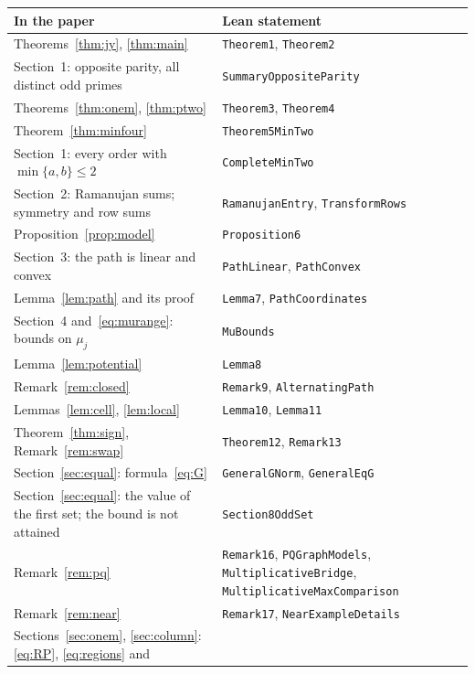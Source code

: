 \documentclass[11pt]{article}
\theoremstyle{remark}
\begin{document}
\begin{table}[ht]\centering\footnotesize
\begin{tabular}{@{}>{\raggedright\arraybackslash}p{}
 >{\raggedright\arraybackslash}p{}@{}}\toprule
In the paper & Lean statement\\\midrule
Theorems~\ref{thm:jy}, \ref{thm:main} & \texttt{Theorem1}, \texttt{Theorem2}\\
Section~1: opposite parity, all distinct odd primes &
 \texttt{SummaryOppositeParity}\\
Theorems~\ref{thm:onem}, \ref{thm:ptwo} & \texttt{Theorem3}, \texttt{Theorem4}\\
Theorem~\ref{thm:minfour} & \texttt{Theorem5MinTwo}\\
Section~1: every order with $\min\{a,b\}\le2$ & \texttt{CompleteMinTwo}\\
Section~2: Ramanujan sums; symmetry and row sums & \texttt{RamanujanEntry},
 \texttt{TransformRows}\\
Proposition~\ref{prop:model} & \texttt{Proposition6}\\
Section~3: the path is linear and convex & \texttt{PathLinear},
 \texttt{PathConvex}\\
Lemma~\ref{lem:path} and its proof & \texttt{Lemma7}, \texttt{PathCoordinates}\\
Section~4 and~\eqref{eq:murange}: bounds on $\mu_j$ & \texttt{MuBounds}\\
Lemma~\ref{lem:potential} & \texttt{Lemma8}\\
Remark~\ref{rem:closed} & \texttt{Remark9}, \texttt{AlternatingPath}\\
Lemmas~\ref{lem:cell}, \ref{lem:local} & \texttt{Lemma10}, \texttt{Lemma11}\\
Theorem~\ref{thm:sign}, Remark~\ref{rem:swap} & \texttt{Theorem12},
 \texttt{Remark13}\\
Section~\ref{sec:equal}: formula~\eqref{eq:G} & \texttt{GeneralGNorm},
 \texttt{GeneralEqG}\\
Section~\ref{sec:equal}: the value of the first set; the bound is not attained &
 \texttt{Section8OddSet}\\
Remark~\ref{rem:pq} & \texttt{Remark16}, \texttt{PQGraphModels},
 \texttt{MultiplicativeBridge}, \texttt{MultiplicativeMaxComparison}\\
Remark~\ref{rem:near} & \texttt{Remark17}, \texttt{NearExampleDetails}\\
Sections~\ref{sec:onem}, \ref{sec:column}: \eqref{eq:RP}, \eqref{eq:regions} and

\end{tabular}
\end{table}
\end{document}
